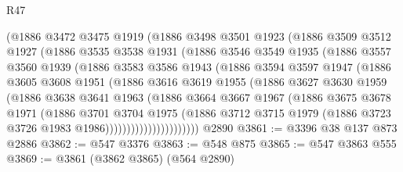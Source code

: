 \begin{lexlean}{R47}
\begin{coremodule}
              (@1886
                @3472
                @3475
                @1919
                (@1886
                  @3498
                  @3501
                  @1923
                  (@1886
                    @3509
                    @3512
                    @1927
                    (@1886
                      @3535
                      @3538
                      @1931
                      (@1886
                        @3546
                        @3549
                        @1935
                        (@1886
                          @3557
                          @3560
                          @1939
                          (@1886
                            @3583
                            @3586
                            @1943
                            (@1886
                              @3594
                              @3597
                              @1947
                              (@1886
                                @3605
                                @3608
                                @1951
                                (@1886
                                  @3616
                                  @3619
                                  @1955
                                  (@1886
                                    @3627
                                    @3630
                                    @1959
                                    (@1886
                                      @3638
                                      @3641
                                      @1963
                                      (@1886
                                        @3664
                                        @3667
                                        @1967
                                        (@1886
                                          @3675
                                          @3678
                                          @1971
                                          (@1886
                                            @3701
                                            @3704
                                            @1975
                                            (@1886
                                              @3712
                                              @3715
                                              @1979
                                              (@1886 @3723 @3726 @1983 @1986))))))))))))))))))))))
    @2890
@3861 := @3396 @38 @137 @873 @2886
@3862 := @547 @3376
@3863 := @548 @875
@3865 := @547 @3863 @555
@3869 := @3861 (@3862 @3865) (@564 @2890)

\end{coremodule}
\end{lexlean}
